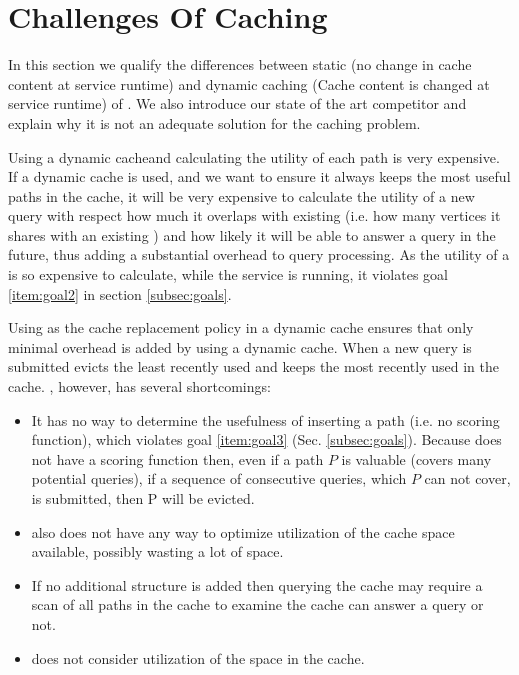 \section{Challenges Of \spath Caching}\label{sec:competitors}

In this section we qualify the differences between static (no change in cache content at service runtime) and dynamic caching (Cache content is changed at service runtime) of \spathsns. We also introduce our state of the art competitor and explain why it is not an adequate solution for the \spath caching problem.


Using a dynamic cache\footnotemark and calculating the utility of each path is very expensive. If a dynamic cache is used, and we want to ensure it always keeps the most useful paths in the cache, it will be very expensive to calculate the utility of a new query with respect how much it overlaps with existing \spaths (i.e. how many vertices it shares with an existing \spathns) and how likely it will be able to answer a query in the future, thus adding a substantial overhead to query processing. As the utility of a \spath is so expensive to calculate, while the \spath service is running, it violates goal \ref{item:goal2} in section \ref{subsec:goals}.

Using \lru as the cache replacement policy in a dynamic cache ensures that only minimal overhead is added by using a dynamic cache. When a new query is submitted \lru evicts the least recently used \spath and keeps the most recently used \spaths in the cache.
\lru, however, has several shortcomings: 
\begin{itemize}
\item It has no way to determine the usefulness of inserting a path (i.e. no scoring function), which violates goal \ref{item:goal3} (Sec. \ref{subsec:goals}). Because \lru does not have a scoring function then, even if a path $P$ is valuable (covers many potential queries), if a sequence of consecutive queries, which $P$ can not cover, is submitted, then P will be evicted. 
\item \lru also does not have any way to optimize utilization of the cache space available, possibly wasting a lot of space. 
\item If no additional structure is added then querying the cache may require a scan of all paths in the cache to examine the cache can answer a query or not.
\item \lru does not consider utilization of the space in the cache.
\end{itemize}




